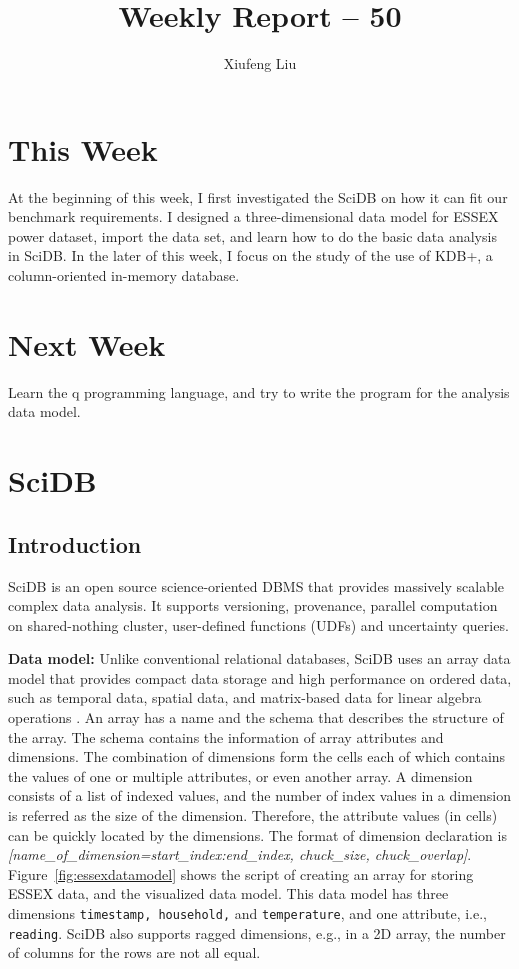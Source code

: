 \documentclass[a4paper,12pt]{llncs}
\newcommand{\ie}{i.e.}
\newcommand{\eg}{e.g.}
\begin{document}
\title{Weekly Report -- 50}
\author{Xiufeng Liu}
\maketitle


\section{This Week}
At the beginning of this week, I first investigated the SciDB on how it can fit our benchmark requirements. I designed a three-dimensional data model for ESSEX power dataset,  import the data set, and learn how to do the basic data analysis in SciDB. In the later of this week, I focus on the study of the use of KDB+, a column-oriented in-memory database.

\section{Next Week}
Learn the q programming language, and try to write the program for the  analysis data model.

\section{SciDB}
\subsection{Introduction}
\label{sec:scidb}
SciDB is an open source science-oriented DBMS that provides massively scalable complex data analysis. It supports versioning, provenance, parallel computation on shared-nothing cluster, user-defined functions (UDFs) and uncertainty queries. 

{\bf Data model:} Unlike conventional relational databases, SciDB uses an array data model that provides compact data storage and high performance on ordered data, such as temporal data, spatial data, and matrix-based data for linear algebra operations \cite{scidb}.  An array has a name and the schema that describes the structure of the array. The schema contains the information of array attributes and dimensions. The combination of dimensions form the cells each of which contains the values of one or multiple attributes, or even another array. A dimension consists of a list of indexed values, and the number of index values in a dimension is referred as the size of the dimension. Therefore, the attribute values (in cells) can be quickly located by the dimensions. The format of dimension declaration is \emph{[name\_of\_dimension=start\_index:end\_index, chuck\_size, chuck\_overlap]}. Figure~\ref{fig:essexdatamodel} shows the script of creating an array for storing ESSEX data, and the visualized data model.  This data model has three dimensions \texttt{timestamp, household,} and \texttt{temperature}, and one attribute, \ie, \texttt{reading}. SciDB also supports ragged dimensions, \eg, in a 2D array, the number of columns for the rows are not all equal. 
\end{document}
